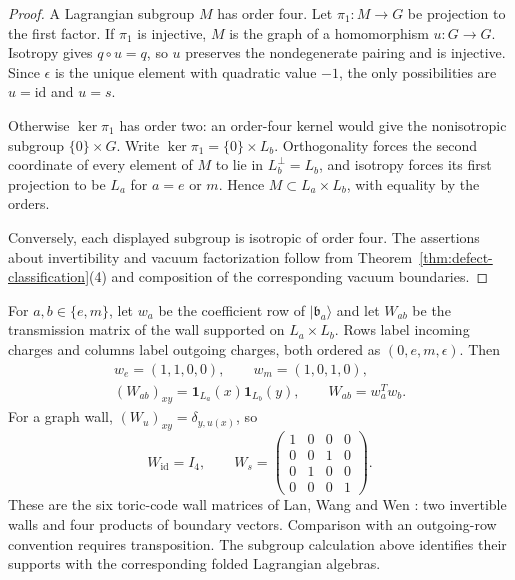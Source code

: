 \documentclass[12pt]{amsart}
\numberwithin{equation}{section}
\theoremstyle{definition}
\begin{document}
\begin{proof}
A Lagrangian subgroup $M$ has order four.
Let $\pi_1:M\to G$ be projection to the first factor.
If $\pi_1$ is injective, $M$ is the graph of a homomorphism
$u:G\to G$. Isotropy gives $q\circ u=q$, so $u$ preserves the
nondegenerate pairing and is injective. Since $\epsilon$ is the
unique element with quadratic value $-1$, the only possibilities
are $u=\mathrm{id}$ and $u=s$.

Otherwise $\ker\pi_1$ has order two: an order-four kernel would
give the nonisotropic subgroup $\{0\}\times G$.
Write $\ker\pi_1=\{0\}\times L_b$.
Orthogonality forces the second coordinate of every element of
$M$ to lie in $L_b^\perp=L_b$, and isotropy forces its first
projection to be $L_a$ for $a=e$ or $m$.
Hence $M\subset L_a\times L_b$, with equality by the orders.

Conversely, each displayed subgroup is isotropic of order four.
The assertions about invertibility and vacuum factorization
follow from Theorem~\ref{thm:defect-classification}(4) and
composition of the corresponding vacuum boundaries.
\end{proof}

For $a,b\in\{e,m\}$, let $w_a$ be the coefficient row of
$|\mathfrak b_a\rangle$ and let $W_{ab}$ be the transmission
matrix of the wall supported on $L_a\times L_b$.
Rows label incoming charges and columns label outgoing charges,
both ordered as $(0,e,m,\epsilon)$. Then
\begin{equation}
\label{eq:gauge-toric-matrices}
\begin{gathered}
w_e=(1,1,0,0),
\qquad
w_m=(1,0,1,0),
\\
(W_{ab})_{xy}
=
\mathbf1_{L_a}(x)\mathbf1_{L_b}(y),
\qquad
W_{ab}=w_a^T w_b.
\end{gathered}
\end{equation}
For a graph wall,
$(W_u)_{xy}=\delta_{y,u(x)}$, so
$$
W_{\mathrm{id}}=I_4,
\qquad
W_s=
\begin{pmatrix}
1&0&0&0\\
0&0&1&0\\
0&1&0&0\\
0&0&0&1
\end{pmatrix}.
$$
These are the six toric-code wall matrices of Lan, Wang and Wen
\cite[Supplemental Material, Section~II]{LanWangWen2015TC}:
two invertible walls and four products of boundary vectors.
Comparison with an outgoing-row convention requires transposition.
The subgroup calculation above identifies their supports with
the corresponding folded Lagrangian algebras.
\end{document}
